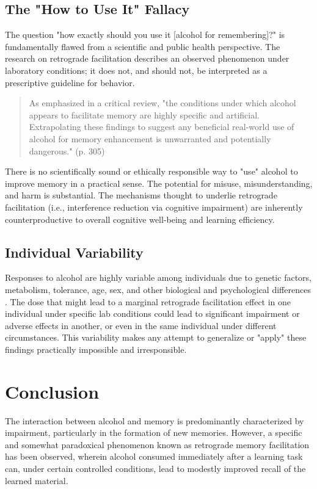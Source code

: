 \documentclass[12pt, a4paper]{article}
\begin{document}
\subsection{The "How to Use It" Fallacy}
The question "how exactly should you use it [alcohol for remembering]?" is fundamentally flawed from a scientific and public health perspective. The research on retrograde facilitation describes an observed phenomenon under laboratory conditions; it does not, and should not, be interpreted as a prescriptive guideline for behavior.
\begin{quote}
    As \cite{Albery1999} emphasized in a critical review, "the conditions under which alcohol appears to facilitate memory are highly specific and artificial. Extrapolating these findings to suggest any beneficial real-world use of alcohol for memory enhancement is unwarranted and potentially dangerous." (p. 305)
\end{quote}
There is no scientifically sound or ethically responsible way to "use" alcohol to improve memory in a practical sense. The potential for misuse, misunderstanding, and harm is substantial. The mechanisms thought to underlie retrograde facilitation (i.e., interference reduction via cognitive impairment) are inherently counterproductive to overall cognitive well-being and learning efficiency.

\subsection{Individual Variability}
Responses to alcohol are highly variable among individuals due to genetic factors, metabolism, tolerance, age, sex, and other biological and psychological differences \cite{NIAAA2000}. The dose that might lead to a marginal retrograde facilitation effect in one individual under specific lab conditions could lead to significant impairment or adverse effects in another, or even in the same individual under different circumstances. This variability makes any attempt to generalize or "apply" these findings practically impossible and irresponsible.

\section{Conclusion}
The interaction between alcohol and memory is predominantly characterized by impairment, particularly in the formation of new memories. However, a specific and somewhat paradoxical phenomenon known as retrograde memory facilitation has been observed, wherein alcohol consumed immediately after a learning task can, under certain controlled conditions, lead to modestly improved recall of the learned material.
\end{document}

